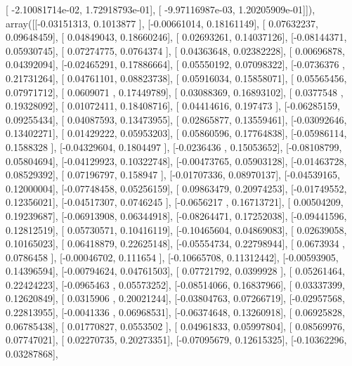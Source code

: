 \documentclass{article}
\begin{document}
       [ -2.10081714e-02,   1.72918793e-01],
       [ -9.97116987e-03,   1.20205909e-01]]), array([[-0.03151313,  0.1013877 ],
       [-0.00661014,  0.18161149],
       [ 0.07632237,  0.09648459],
       [ 0.04849043,  0.18660246],
       [ 0.02693261,  0.14037126],
       [-0.08144371,  0.05930745],
       [ 0.07274775,  0.0764374 ],
       [ 0.04363648,  0.02382228],
       [ 0.00696878,  0.04392094],
       [-0.02465291,  0.17886664],
       [ 0.05550192,  0.07098322],
       [-0.0736376 ,  0.21731264],
       [ 0.04761101,  0.08823738],
       [ 0.05916034,  0.15858071],
       [ 0.05565456,  0.07971712],
       [ 0.0609071 ,  0.17449789],
       [ 0.03088369,  0.16893102],
       [ 0.0377548 ,  0.19328092],
       [ 0.01072411,  0.18408716],
       [ 0.04414616,  0.197473  ],
       [-0.06285159,  0.09255434],
       [ 0.04087593,  0.13473955],
       [ 0.02865877,  0.13559461],
       [-0.03092646,  0.13402271],
       [ 0.01429222,  0.05953203],
       [ 0.05860596,  0.17764838],
       [-0.05986114,  0.1588328 ],
       [-0.04329604,  0.1804497 ],
       [-0.0236436 ,  0.15053652],
       [-0.08108799,  0.05804694],
       [-0.04129923,  0.10322748],
       [-0.00473765,  0.05903128],
       [-0.01463728,  0.08529392],
       [ 0.07196797,  0.158947  ],
       [-0.01707336,  0.08970137],
       [-0.04539165,  0.12000004],
       [-0.07748458,  0.05256159],
       [ 0.09863479,  0.20974253],
       [-0.01749552,  0.12356021],
       [-0.04517307,  0.0746245 ],
       [-0.0656217 ,  0.16713721],
       [ 0.00504209,  0.19239687],
       [-0.06913908,  0.06344918],
       [-0.08264471,  0.17252038],
       [-0.09441596,  0.12812519],
       [ 0.05730571,  0.10416119],
       [-0.10465604,  0.04869083],
       [ 0.02639058,  0.10165023],
       [ 0.06418879,  0.22625148],
       [-0.05554734,  0.22798944],
       [ 0.0673934 ,  0.0786458 ],
       [-0.00046702,  0.111654  ],
       [-0.10665708,  0.11312442],
       [-0.00593905,  0.14396594],
       [-0.00794624,  0.04761503],
       [ 0.07721792,  0.0399928 ],
       [ 0.05261464,  0.22424223],
       [-0.0965463 ,  0.05573252],
       [-0.08514066,  0.16837966],
       [ 0.03337399,  0.12620849],
       [ 0.0315906 ,  0.20021244],
       [-0.03804763,  0.07266719],
       [-0.02957568,  0.22813955],
       [-0.0041336 ,  0.06968531],
       [-0.06374648,  0.13260918],
       [ 0.06925828,  0.06785438],
       [ 0.01770827,  0.0553502 ],
       [ 0.04961833,  0.05997804],
       [ 0.08569976,  0.07747021],
       [ 0.02270735,  0.20273351],
       [-0.07095679,  0.12615325],
       [-0.10362296,  0.03287868],
\end{document}
